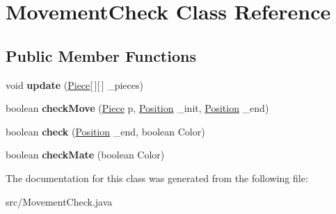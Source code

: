 \hypertarget{class_movement_check}{\section{Movement\-Check Class Reference}
\label{class_movement_check}
}
\subsection*{Public Member Functions}
\begin{DoxyCompactItemize}
\item 
\hypertarget{class_movement_check_ad4282505567223574aad557238ec3962}{void {\bfseries update} (\hyperlink{class_basic___objects_1_1_piece}{Piece}\mbox{[}$\,$\mbox{]}\mbox{[}$\,$\mbox{]} \-\_\-pieces)}\label{class_movement_check_ad4282505567223574aad557238ec3962}

\item 
\hypertarget{class_movement_check_a7de16c5e5e34bea53f45a84c0357b3cf}{boolean {\bfseries check\-Move} (\hyperlink{class_basic___objects_1_1_piece}{Piece} p, \hyperlink{class_basic___objects_1_1_position}{Position} \-\_\-init, \hyperlink{class_basic___objects_1_1_position}{Position} \-\_\-end)}\label{class_movement_check_a7de16c5e5e34bea53f45a84c0357b3cf}

\item 
\hypertarget{class_movement_check_a419c5a5eba3dd02a9a9d0fe56df331b9}{boolean {\bfseries check} (\hyperlink{class_basic___objects_1_1_position}{Position} \-\_\-end, boolean Color)}\label{class_movement_check_a419c5a5eba3dd02a9a9d0fe56df331b9}

\item 
\hypertarget{class_movement_check_a6f044b7c75dd4d54dc1253937e885c6a}{boolean {\bfseries check\-Mate} (boolean Color)}\label{class_movement_check_a6f044b7c75dd4d54dc1253937e885c6a}

\end{DoxyCompactItemize}


The documentation for this class was generated from the following file\-:\begin{DoxyCompactItemize}
\item 
src/Movement\-Check.\-java\end{DoxyCompactItemize}
